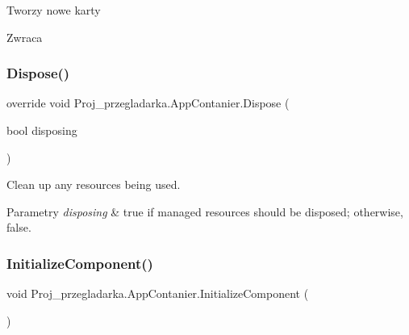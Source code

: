 Tworzy nowe karty 

\begin{DoxyReturn}{Zwraca}

\end{DoxyReturn}
\mbox{\label{class_proj__przegladarka_1_1_app_contanier_a2827fbfbdd9cea7ccb6816f2d6e22c9a}} 
\subsubsection{\texorpdfstring{Dispose()}{Dispose()}}
{\footnotesize\ttfamily override void Proj\+\_\+przegladarka.\+App\+Contanier.\+Dispose (\begin{DoxyParamCaption}\item[{bool}]{disposing }\end{DoxyParamCaption})\hspace{0.3cm}{\ttfamily [protected]}}



Clean up any resources being used. 


\begin{DoxyParams}{Parametry}
{\em disposing} & true if managed resources should be disposed; otherwise, false.\\
\hline
\end{DoxyParams}
\mbox{\label{class_proj__przegladarka_1_1_app_contanier_a40f68d77f8a7d5b60d939ab0cc7a7274}} 
\subsubsection{\texorpdfstring{InitializeComponent()}{InitializeComponent()}}
{\footnotesize\ttfamily void Proj\+\_\+przegladarka.\+App\+Contanier.\+Initialize\+Component (\begin{DoxyParamCaption}{ }\end{DoxyParamCaption})\hspace{0.3cm}{\ttfamily [private]}}



